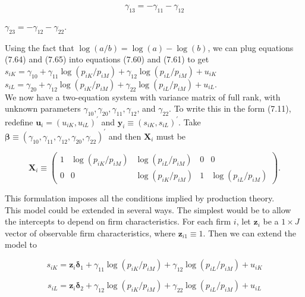 \documentclass[10pt]{article}
\begin{document}
\begin{equation*}
\gamma_{13}=-\gamma_{11}-\gamma_{12} \tag{7.64}
\end{equation*}


$\gamma_{23}=-\gamma_{12}-\gamma_{22}$.

Using the fact that $\log (a / b)=\log (a)-\log (b)$, we can plug equations (7.64) and (7.65) into equations (7.60) and (7.61) to get\\
$s_{i K}=\gamma_{10}+\gamma_{11} \log \left(p_{i K} / p_{i M}\right)+\gamma_{12} \log \left(p_{i L} / p_{i M}\right)+u_{i K}$\\
$s_{i L}=\gamma_{20}+\gamma_{12} \log \left(p_{i K} / p_{i M}\right)+\gamma_{22} \log \left(p_{i L} / p_{i M}\right)+u_{i L}$.\\
We now have a two-equation system with variance matrix of full rank, with unknown parameters $\gamma_{10}, \gamma_{20}, \gamma_{11}, \gamma_{12}$, and $\gamma_{22}$. To write this in the form (7.11), redefine $\mathbf{u}_{i}= \left(u_{i K}, u_{i L}\right)^{\prime}$ and $\mathbf{y}_{i} \equiv\left(s_{i K}, s_{i L}\right)^{\prime}$. Take $\boldsymbol{\beta} \equiv\left(\gamma_{10}, \gamma_{11}, \gamma_{12}, \gamma_{20}, \gamma_{22}\right)^{\prime}$ and then $\mathbf{X}_{i}$ must be

\[
\mathbf{X}_{i} \equiv\left(\begin{array}{ccccc}
1 & \log \left(p_{i K} / p_{i M}\right) & \log \left(p_{i L} / p_{i M}\right) & 0 & 0  \tag{7.66}\\
0 & 0 & \log \left(p_{i K} / p_{i M}\right) & 1 & \log \left(p_{i L} / p_{i M}\right)
\end{array}\right) .
\]

This formulation imposes all the conditions implied by production theory.\\
This model could be extended in several ways. The simplest would be to allow the intercepts to depend on firm characteristics. For each firm $i$, let $\mathbf{z}_{i}$ be a $1 \times J$ vector of observable firm characteristics, where $\mathbf{z}_{i 1} \equiv 1$. Then we can extend the model to


\begin{equation*}
s_{i K}=\mathbf{z}_{i} \boldsymbol{\delta}_{1}+\gamma_{11} \log \left(p_{i K} / p_{i M}\right)+\gamma_{12} \log \left(p_{i L} / p_{i M}\right)+u_{i K} \tag{7.67}
\end{equation*}



\begin{equation*}
s_{i L}=\mathbf{z}_{i} \boldsymbol{\delta}_{2}+\gamma_{12} \log \left(p_{i K} / p_{i M}\right)+\gamma_{22} \log \left(p_{i L} / p_{i M}\right)+u_{i L} \tag{7.68}
\end{equation*}
\end{document}

